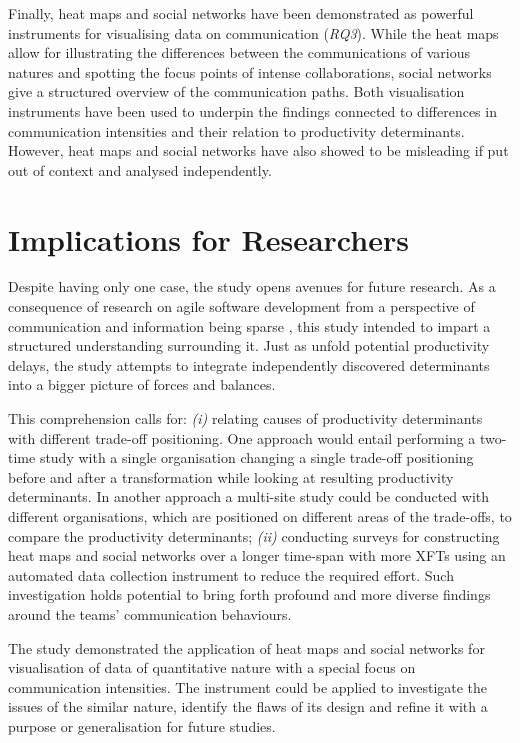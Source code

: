 Finally, heat maps and social networks have been demonstrated as powerful instruments for visualising data on communication (\textit{RQ3}). While the heat maps allow for illustrating the differences between the communications of various natures and spotting the focus points of intense collaborations, social networks give a structured overview of the communication paths. Both visualisation instruments have been used to underpin the findings connected to differences in communication intensities and their relation to productivity determinants. However, heat maps and social networks have also showed to be misleading if put out of context and analysed independently.

\section{Implications for Researchers}

Despite having only one case, the study opens avenues for future research.
As a consequence of research on agile software development from a perspective of communication and information being sparse \citep{pikkarainen2008impactagilecommunication}, this study intended to impart a structured understanding surrounding it. Just as \citet{badampudi2013proddelay} unfold potential productivity delays, the study attempts to integrate independently discovered determinants into a bigger picture of forces and balances.

This comprehension calls for: \emph{(i)} relating causes of productivity determinants with different trade-off positioning. One approach would entail performing a two-time study with a single organisation changing a single trade-off positioning before and after a transformation while looking at resulting productivity determinants. In another approach a multi-site study could be conducted with different organisations, which are positioned on different areas of the trade-offs, to compare the productivity determinants; \emph{(ii)} conducting surveys for constructing heat maps and social networks over a longer time-span with more \acp{XFT} using an automated data collection instrument to reduce the required effort. Such investigation holds potential to bring forth profound and more diverse findings around the teams' communication behaviours.

The study demonstrated the application of heat maps and social networks for visualisation of data of quantitative nature with a special focus on communication intensities. The instrument could be applied to investigate the issues of the similar nature, identify the flaws of its design and refine it with a purpose or generalisation for future studies.

